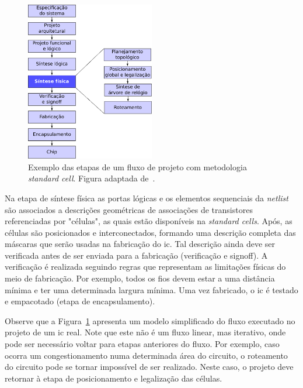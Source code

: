 \begin{figure}[]
    \centering
    \includegraphics[width=0.5\textwidth]{img/introducao/exemplo_fluxo.pdf}
    \caption[Etapas do fluxo \textit{standard cell}.]{Exemplo das etapas de um fluxo de projeto com metodologia \textit{standard cell}. Figura adaptada de~.}
    \label{fig:exemplo_fluxo}
\end{figure}

Na etapa de síntese física as portas lógicas e os elementos sequenciais da \textit{netlist} são associados a descrições geométricas de associações de transistores referenciadas por "células", as quais estão disponíveis na \textit{standard cells}.
Após, as células são posicionados e interconectados, formando uma descrição completa das máscaras que serão usadas na fabricação do \ac{ic}.
Tal descrição ainda deve ser verificada antes de ser enviada para a fabricação (verificação e signoff).
A verificação é realizada seguindo regras que representam as limitações físicas do meio de fabricação.
Por exemplo, todos os fios devem estar a uma distância mínima e ter uma determinada largura mínima.
Uma vez fabricado, o \ac{ic} é testado e empacotado (etapa de encapsulamento).

Observe que a Figura~\ref{fig:exemplo_fluxo} apresenta um modelo simplificado do fluxo executado no projeto de um \ac{ic} real.
Note que este não é um fluxo linear, mas iterativo, onde pode ser necessário voltar para etapas anteriores do fluxo.
Por exemplo, caso ocorra um congestionamento numa determinada área do circuito, o roteamento do circuito pode se tornar impossível de ser realizado. Neste caso, o projeto deve retornar à etapa de posicionamento e legalização das células.

